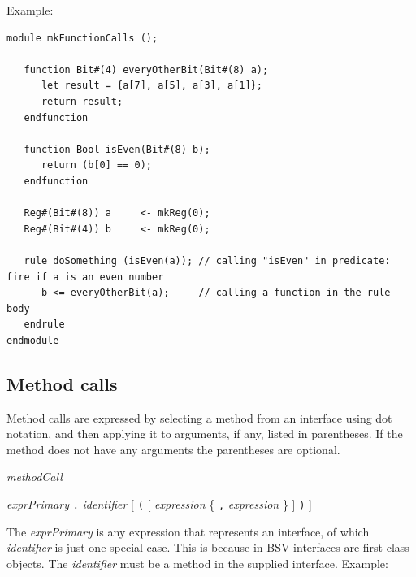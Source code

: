 \documentclass[twoside,letterpaper]{article}
\newcommand{\hm}{\hspace*{1em}}
\newcommand{\BSV}{BSV}
\newcommand{\nterm}[1]{\emph{#1}}
\newcommand{\term}[1]{\texttt{#1}}
\newcommand{\many}[1]{\{ #1 \}}
\newcommand{\opt}[1]{[ #1 ]}
\newcommand{\gram}[2]{    \hm\makebox[10em][l]{\it #1}\makebox[1.5em][l]{::=}    #2}
\begin{document}
Example:
\begin{verbatim}
module mkFunctionCalls ();

   function Bit#(4) everyOtherBit(Bit#(8) a);
      let result = {a[7], a[5], a[3], a[1]};
      return result;
   endfunction

   function Bool isEven(Bit#(8) b);
      return (b[0] == 0);
   endfunction
   
   Reg#(Bit#(8)) a     <- mkReg(0);
   Reg#(Bit#(4)) b     <- mkReg(0);

   rule doSomething (isEven(a)); // calling "isEven" in predicate: fire if a is an even number
      b <= everyOtherBit(a);     // calling a function in the rule body
   endrule
endmodule
\end{verbatim}

\subsection{Method calls}

\label{sec-method-calls}

Method calls are expressed by selecting a method from an interface
using dot notation, and then applying it to arguments, if any, listed in
parentheses.  If the method does not have any arguments the
parentheses are optional.

\gram{exprPrimary}{ \nterm{methodCall} }

\gram{methodCall}{ \nterm{exprPrimary}
                       \term{.}
                       \nterm{identifier}
                       \opt{ \term{(} \opt{
                       \nterm{expression} \many{ \term{,} \nterm{expression}} }
                       \term{)} }}

The \nterm{exprPrimary} is any expression that represents an
interface, of which \nterm{identifier} is just one special case.  This
is because in {\BSV} interfaces are first-class objects.  The
\nterm{identifier} must be a method in the supplied interface. Example:
\end{document}

